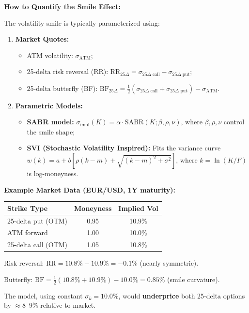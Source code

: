 \textbf{How to Quantify the Smile Effect:}

The volatility smile is typically parameterized using:

\begin{enumerate}
	\item \textbf{Market Quotes:}
	\begin{itemize}
		\item ATM volatility: $\sigma_{\text{ATM}}$;
		\item 25-delta risk reversal (RR): $\text{RR}_{25\Delta} = \sigma_{25\Delta \text{ call}} - \sigma_{25\Delta \text{ put}}$;
		\item 25-delta butterfly (BF): $\text{BF}_{25\Delta} = \frac{1}{2}(\sigma_{25\Delta \text{ call}} + \sigma_{25\Delta \text{ put}}) - \sigma_{\text{ATM}}$.
	\end{itemize}
	
	\item \textbf{Parametric Models:}
	\begin{itemize}
		\item \textbf{SABR model:} $\sigma_{\text{impl}}(K) = \alpha \cdot \text{SABR}(K; \beta, \rho, \nu)$, where $\beta, \rho, \nu$ control the smile shape;
		\item \textbf{SVI (Stochastic Volatility Inspired):} Fits the variance curve $w(k) = a + b[\rho(k-m) + \sqrt{(k-m)^2 + \sigma^2}]$, where $k = \ln(K/F)$ is log-moneyness.
	\end{itemize}
\end{enumerate}

\textbf{Example Market Data (EUR/USD, 1Y maturity):}

\begin{center}
	\begin{tabular}{|l|c|c|}
		\hline
		\textbf{Strike Type} & \textbf{Moneyness} & \textbf{Implied Vol} \\
		\hline
		25-delta put (OTM) & 0.95 & 10.9\% \\
		ATM forward & 1.00 & 10.0\% \\
		25-delta call (OTM) & 1.05 & 10.8\% \\
		\hline
	\end{tabular}
\end{center}

Risk reversal: $\text{RR} = 10.8\% - 10.9\% = -0.1\%$ (nearly symmetric).

Butterfly: $\text{BF} = \frac{1}{2}(10.8\% + 10.9\%) - 10.0\% = 0.85\%$ (smile curvature).

The model, using constant $\sigma_k = 10.0\%$, would \textbf{underprice} both 25-delta options by $\approx 8$--9\% relative to market.

